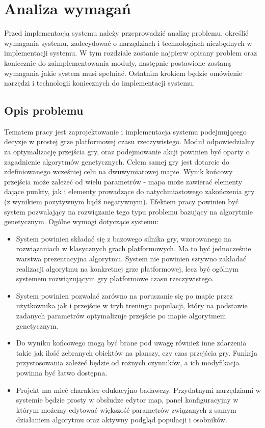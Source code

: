 \chapter{Analiza wymagań}
Przed implementacją systemu należy przeprowadzić analizę problemu, określić wymagania systemu, zadecydować o narzędziach i technologiach niezbędnych w implementacji systemu.
W tym rozdziale zostanie najpierw opisany problem oraz koniecznie do zaimplementowania moduły, następnie postawione zostaną wymagania jakie system musi spełniać. Ostatnim krokiem będzie omówienie narzędzi i technologii koniecznych do implementacji systemu.
\section{Opis problemu}
\begin{par}
	Tematem pracy jest zaprojektowanie i implementacja systemu podejmującego decyzje w prostej grze platformowej czasu rzeczywistego.
	Moduł odpowiedzialny za optymalizację przejścia gry, oraz podejmowanie akcji powinien być oparty o zagadnienie algorytmów genetycznych.
	Celem samej gry jest dotarcie do zdefiniowanego wcześniej celu na dwuwymiarowej mapie. Wynik końcowy przejścia może zależeć od wielu parametrów - mapa może zawierać elementy dające punkty, jak i elementy prowadzące do natychmiastowego zakończenia gry (z wynikiem pozytywnym bądź negatywnym).
	Efektem pracy powinien być system pozwalający na rozwiązanie tego typu problemu bazujący na algorytmie genetycznym.
	\newline
	Ogólne wymogi dotyczące systemu:
	\begin{itemize}
		\item
			System powinien składać się z bazowego silnika gry, wzorowanego na rozwiązaniach w klasycznych grach platformowych. Ma to być jednocześnie warstwa prezentacyjna algorytmu.
			System nie powinien sztywno zakładać realizacji algorytmu na konkretnej grze platformowej, lecz być ogólnym systemem rozwiązującym gry platformowe czasu rzeczywistego.
		\item
			System powinien pozwalać zarówno na poruszanie się po mapie przez użytkownika jak i przejście w tryb treningu populacji, który na podstawie zadanych parametrów optymalizuje przejście po mapie algorytmem genetycznym.
		\item
			Do wyniku końcowego mogą być brane pod uwagę również inne zdarzenia takie jak ilość zebranych obiektów na planszy, czy czas przejścia gry.
			Funkcja przystosowania zależeć będzie od rożnych czynników, a ich modyfikacja powinna być łatwo dostępna.
		\item
			Projekt ma mieć charakter edukacyjno-badawczy. Przydatnymi narzędziami w systemie będzie prosty w obsłudze edytor map, panel konfiguracyjny w którym możemy edytować większość parametrów związanych z samym działaniem algorytmu oraz aktywny podgląd populacji i osobników.
	\end{itemize}
\end{par}

